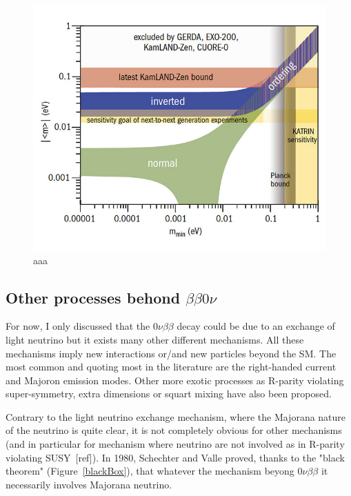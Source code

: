 \documentclass[main.tex]{subfiles}
\begin{document}
\begin{figure}[h!]
\begin{center}
\includegraphics[scale=0.60]{pictures/Chap2/MeffVsMmin.jpg}
\caption{aaa}
\label{MeffVsMmin}
\end{center}
\end{figure}


\FloatBarrier

\subsection{Other processes behond $\beta\beta0\nu$}


\NI For now, I only discussed that the 0$\nu\beta\beta$ decay could be due to an exchange of light neutrino but it exists many  other different mechanisms. All these mechanisms imply new interactions or/and new particles beyond the SM. The most common and quoting most in the literature are the right-handed current and Majoron emission modes. Other more exotic processes as R-parity violating super-symmetry, extra dimensions or squart mixing have also been proposed.


\bigskip


\NI Contrary to the light neutrino exchange mechanism, where the Majorana nature of the neutrino is quite clear, it is not completely obvious for other mechanisms (and in particular for mechanism where neutrino are not involved as in R-parity violating SUSY~[ref]). In 1980, Schechter and Valle proved, thanks to the "black theorem" (Figure~\ref{blackBox}), that whatever the mechanism beyong 0$\nu\beta\beta$ it necessarily involves Majorana neutrino.
\end{document}
